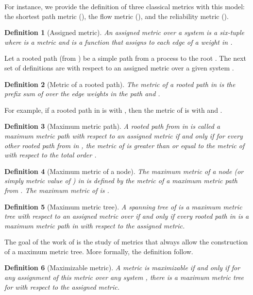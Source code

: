 \documentclass[11pt]{article}
\newtheorem{defi}{Definition}
\newenvironment{definition}[1]{\vspace{-0.25cm}\begin{defi}#1}{\end{defi}\vspace{-0.3cm}}
\begin{document}
For instance, we provide the definition of three classical metrics with this model: the shortest path metric (), the flow metric (), and the reliability metric ().




\begin{definition}[Assigned metric]
An \emph{assigned metric} over a system  is a six-tuple   where  is a metric and  is a function that assigns to each edge of  a weight in .
\end{definition}

Let a rooted path (from ) be a simple path from a process  to the root . The next set of definitions are with respect to an assigned metric  over a given system .

\begin{definition}[Metric of a rooted path]
The \emph{metric of a rooted path} in  is the prefix sum of  over the edge weights in the path and .
\end{definition}

For example, if a rooted path  in  is  with , then the metric of  is  with  and .

\begin{definition}[Maximum metric path]
A rooted path  from  in  is called a \emph{maximum metric path} with respect to an assigned metric if and only if for every other rooted path  from  in , the metric of  is greater than or equal to the metric of  with respect to the total order . 
\end{definition}
 
\begin{definition}[Maximum metric of a node]
The \emph{maximum metric of a node}  (or simply \emph{metric value} of ) in  is defined by the metric of a maximum metric path from . The maximum metric of  is . 
\end{definition}

\begin{definition}[Maximum metric tree]
A spanning tree  of  is a \emph{maximum metric tree} with respect to an assigned metric over  if and only if every rooted path in  is a maximum metric path in  with respect to the assigned metric.
\end{definition}

The goal of the work of \cite{GS03j} is the study of metrics that always allow the construction of a maximum metric tree. More formally, the definition follow.

\begin{definition}[Maximizable metric]
A metric is \emph{maximizable} if and only if for any assignment of this metric over any system , there is a maximum metric tree for  with respect to the assigned metric.
\end{definition}
\end{document}
